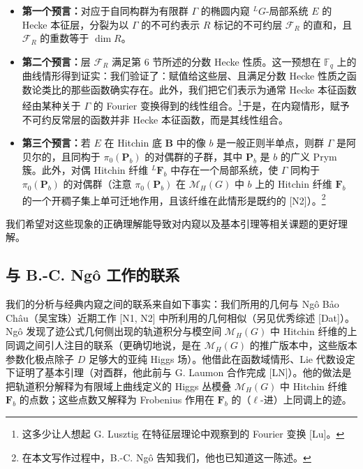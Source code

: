 \documentclass[11pt,a4paper]{article}
\begin{document}
\begin{itemize}[leftmargin=2em,itemsep=2pt,topsep=2pt]
\item \textbf{第一个预言：}对应于自同构群为有限群 $\Gamma$ 的椭圆内窥 ${}^{L}G$-局部系统 $E$ 的 Hecke 本征层，分裂为以 $\Gamma$ 的不可约表示 $R$ 标记的不可约层 $\mathcal{F}_R$ 的直和，且 $\mathcal{F}_R$ 的重数等于 $\dim R$。
\item \textbf{第二个预言：}层 $\mathcal{F}_R$ 满足第 6 节所述的分数 Hecke 性质。这一预想在 $\mathbb{F}_q$ 上的曲线情形得到证实：我们验证了：赋值给这些层、且满足分数 Hecke 性质之函数论类比的那些函数确实存在。此外，我们把它们表示为通常 Hecke 本征函数经由某种关于 $\Gamma$ 的 Fourier 变换得到的线性组合。\footnote{这多少让人想起 G. Lusztig 在特征层理论中观察到的 Fourier 变换 [Lu]。}于是，在内窥情形，赋予不可约反常层的函数并非 Hecke 本征函数，而是其线性组合。
\item \textbf{第三个预言：}若 $E$ 在 Hitchin 底 $\boldsymbol{B}$ 中的像 $b$ 是一般正则半单点，则群 $\Gamma$ 是阿贝尔的，且同构于 $\pi_0(\boldsymbol{P}_b)$ 的对偶群的子群，其中 $\boldsymbol{P}_b$ 是 $b$ 的广义 Prym 簇。此外，对偶 Hitchin 纤维 ${}^{L}\boldsymbol{F}_b$ 中存在一个局部系统，使 $\Gamma$ 同构于 $\pi_0(\boldsymbol{P}_b)$ 的对偶群（注意 $\pi_0(\boldsymbol{P}_b)$ 在 $\mathcal{M}_H(G)$ 中 $b$ 上的 Hitchin 纤维 $\boldsymbol{F}_b$ 的一个开稠子集上单可迁地作用，且该纤维在此情形是既约的 [N2]）。\footnote{在本文写作过程中，B.-C. Ngô 告知我们，他也已知道这一陈述。}
\end{itemize}

我们希望对这些现象的正确理解能导致对内窥以及基本引理等相关课题的更好理解。

\subsection{与 B.-C. Ngô 工作的联系}

我们的分析与经典内窥之间的联系来自如下事实：我们所用的几何与 Ngô Bảo Châu（吴宝珠）近期工作 [N1, N2] 中所利用的几何相似（另见优秀综述 [Dat]）。Ngô 发现了迹公式几何侧出现的轨道积分与模空间 $\mathcal{M}_H(G)$ 中 Hitchin 纤维的上同调之间引人注目的联系（更确切地说，是在 $\mathcal{M}_H(G)$ 的推广版本中，这些版本参数化极点除子 $D$ 足够大的亚纯 Higgs 场）。他借此在函数域情形、Lie 代数设定下证明了基本引理（对酉群，他此前与 G. Laumon 合作完成 [LN]）。他的做法是把轨道积分解释为有限域上曲线定义的 Higgs 丛模叠 $\mathcal{M}_H(G)$ 中 Hitchin 纤维 $\boldsymbol{F}_b$ 的点数；这些点数又解释为 Frobenius 作用在 $\boldsymbol{F}_b$ 的（$\ell$-进）上同调上的迹。
\end{document}
